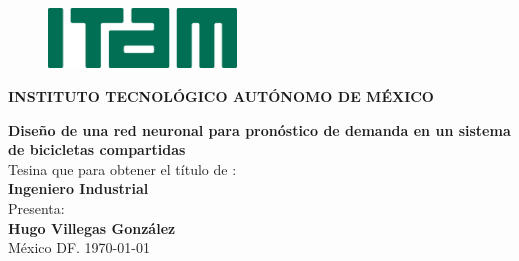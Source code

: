 \documentclass[12pt,spanish]{article}
\begin{document}
	\thispagestyle{empty}
	\begin{figure}
		\centering
		\includegraphics[width=5cm]{Imagenes/Logo_ITAM.jpg}\\
	\end{figure}
	\begin{center}
		\textbf{\large {INSTITUTO  TECNOLÓGICO AUTÓNOMO DE MÉXICO}}\\[0.3cm]
		\vspace{2.5cm}
		
		{\LARGE\textbf{Diseño de una red neuronal para pronóstico de demanda en un sistema de bicicletas compartidas}}\\[1.6cm]
		{\normalsize Tesina que para obtener el título de :}\\[0.1cm]
		{\large  \textbf{Ingeniero Industrial}}\\[2.1cm]
		{\normalsize Presenta: }\\[0.1cm]
		{\large  \textbf{Hugo Villegas González}}\\[2.1cm]
		México DF.  \today
	\end{center}
	\newpage
	\tableofcontents                                %
	\newpage 
	\listoffigures                                  %
	\newpage 
	\listoftables                                   %
	\newpage
	
\end{document}
